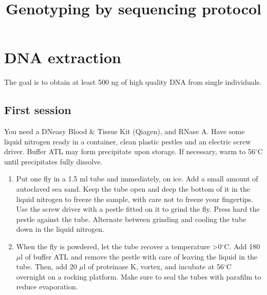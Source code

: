 \documentclass[a4paper,12pt]{article}
\title{Genotyping by sequencing protocol}
\begin{document}
\maketitle
\section{DNA extraction}
The goal is to obtain at least 500 ng of high quality DNA from single individuals. 
\subsection{First session}
You need a DNeasy Blood \& Tissue Kit (Qiagen), and RNase A. Have some liquid nitrogen ready in a container, clean plastic pestles and an electric screw driver. Buffer ATL may form precipitate upon storage. If necessary, warm to 56$^\circ$C until precipitates fully dissolve.
\begin{enumerate}
\item Put one fly in a 1.5 ml tube and immediately, on ice. Add a small amount of autoclaved sea sand. Keep the tube open and deep the bottom of it in the liquid nitrogen to freeze the sample, with care not to freeze your fingertips. Use the screw driver with a pestle fitted on it to grind the fly. Press hard the pestle against the tube. Alternate between grinding and cooling the tube down in the liquid nitrogen.
\item When the fly is powdered, let the tube recover a temperature >0$^\circ$C. Add 180 $\mu$l of buffer ATL and remove the pestle with care of leaving the liquid in the tube. Then, add 20 $\mu$l of proteinase K, vortex, and incubate at 56$^\circ$C overnight on a rocking platform. Make sure to seal the tubes with parafilm to reduce evaporation.
\end{enumerate}
\end{document}
